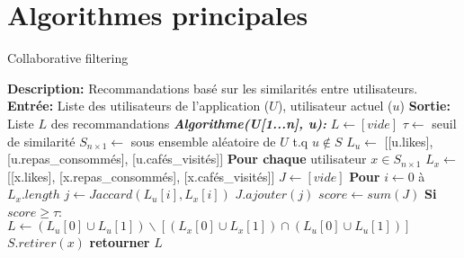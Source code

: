 \documentclass[11pt]{article}
\begin{document}
\section{Algorithmes principales}
\begin{algorithm}
    \caption{Collaborative filtering}
    \begin{algorithmic}[1]
        \Statex \textbf{Description:} Recommandations basé sur les similarités entre utilisateurs.
        \Statex \textbf{Entrée:} Liste des utilisateurs de l'application ($U$), utilisateur actuel ($u$)
        \Statex \textbf{Sortie:} Liste $L$ des recommandations
        \State \textbf{\textit{Algorithme(U[1...n], u):}}
        \State \hspace{0.5cm} $L \leftarrow [vide]$
        \State \hspace{0.5cm} $\tau \leftarrow$ seuil de similarité 
        \State \hspace{0.5cm} $S_{n\times 1} \leftarrow$ sous ensemble aléatoire de $U$ t.q $u \notin S$
        \State \hspace{0.5cm} $L_u \leftarrow$ [[u.likes], [u.repas\_consommés], [u.cafés\_visités]]
        \State \hspace{0.5cm} \textbf{Pour chaque} utilisateur $x\in S_{n\times 1}$
        \State \hspace{1cm} $L_x \leftarrow$ [[x.likes], [x.repas\_consommés], [x.cafés\_visités]]
        \State \hspace{1cm} $J \leftarrow [vide]$
        \State \hspace{1cm} \textbf{Pour} $i \leftarrow 0$ à $L_x.length$
        \State \hspace{1.5cm} $j \leftarrow Jaccard(L_u[i], L_x[i])$
        \State \hspace{1.5cm} $J.ajouter(j)$
        \State \hspace{1cm} $score \leftarrow sum(J)$
        \State \hspace{1cm} \textbf{Si} $score \geq \tau$:
        \State \hspace{1.5cm} $L \leftarrow (L_u[0] \cup L_u[1]) \backslash [(L_x[0] \cup L_x[1]) \cap (L_u[0] \cup L_u[1])]$
        \State \hspace{1cm} $S.retirer(x)$
        \State \hspace{0.5cm} \textbf{retourner} $L$
    \end{algorithmic}
\end{algorithm}
\end{document}
